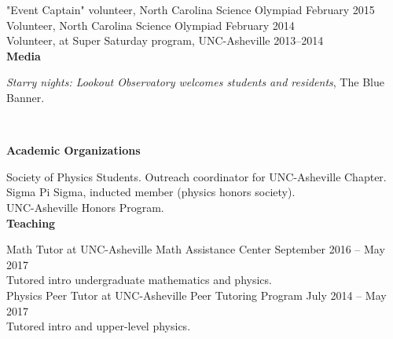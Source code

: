 \documentclass[letterpaper, 11pt]{article}
\newcommand{\noi}{\noindent}
\begin{document}
\noi "Event Captain" volunteer, North Carolina Science Olympiad \hfill February 2015
\\

\noi Volunteer, North Carolina Science Olympiad \hfill February 2014
\\

\noi Volunteer, at Super Saturday program, UNC-Asheville \hfill 2013--2014
\\

\noi \textbf{Media}

\noi \emph{Starry nights: Lookout Observatory welcomes students and residents}, The Blue Banner.
\begin{sloppypar}
\noi {}
\\
\end{sloppypar}

\noi \textbf{Academic Organizations}

\noi Society of Physics Students. Outreach coordinator for UNC-Asheville Chapter.
\\

\noi Sigma Pi Sigma, inducted member (physics honors society).
\\

\noi UNC-Asheville Honors Program.
\\

\noi \textbf{Teaching}

\noi Math Tutor at UNC-Asheville Math Assistance Center \hfill September 2016 -- May 2017
\\
Tutored intro undergraduate mathematics and physics.
\\

\noi Physics Peer Tutor at UNC-Asheville Peer Tutoring Program \hfill July 2014 -- May 2017
\\
Tutored intro and upper-level physics.
\\
\end{document}
